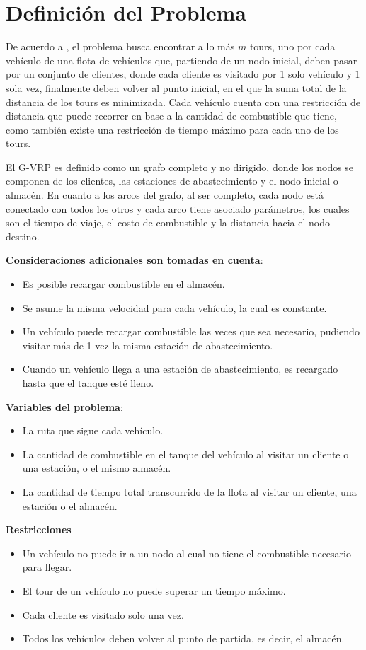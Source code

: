 \documentclass[letter, 10pt]{article}
\begin{document}
\section{Definici\'on del Problema}
De acuerdo a \cite{G-VRP}, el problema busca encontrar a lo más \(m\) tours, uno por cada vehículo de una flota de vehículos que, partiendo de un nodo inicial, deben pasar por un conjunto de clientes, donde cada cliente es visitado por 1 solo vehículo y 1 sola vez, finalmente deben volver al punto inicial, en el que la suma total de la distancia de los tours es minimizada.
Cada vehículo cuenta con una restricción de distancia que puede recorrer en base a la cantidad de combustible que tiene,
como también existe una restricción de tiempo máximo para cada uno de los tours.

El G-VRP es definido como un grafo completo y no dirigido, donde los nodos se componen de los clientes, las estaciones de abastecimiento y el nodo inicial o almacén.
En cuanto a los arcos del grafo, al ser completo, cada nodo está conectado con todos los otros y cada arco tiene asociado parámetros, los cuales son el tiempo de viaje, el costo de combustible y la distancia hacia el nodo destino.
\bigskip

\textbf{Consideraciones adicionales son tomadas en cuenta}:
\begin{itemize}
\item Es posible recargar combustible en el almacén.
\item Se asume la misma velocidad para cada vehículo, la cual es constante.
\item Un vehículo puede recargar combustible las veces que sea necesario, pudiendo visitar más de 1 vez la misma estación de abastecimiento.
\item Cuando un vehículo llega a una estación de abastecimiento, es recargado hasta que el tanque esté lleno.
\end{itemize}

\textbf{Variables del problema}:
\begin{itemize}
\item La ruta que sigue cada vehículo.
\item La cantidad de combustible en el tanque del vehículo al visitar un cliente o
	una estación, o el mismo almacén.
\item La cantidad de tiempo total transcurrido de la flota al visitar un cliente, una estación o
	el almacén.
\end{itemize}

\textbf{Restricciones}
\begin{itemize}
\item Un vehículo no puede ir a un nodo al cual no tiene el combustible necesario para llegar.
\item El tour de un vehículo no puede superar un tiempo máximo.
\item Cada cliente es visitado solo una vez.
\item Todos los vehículos deben volver al punto de partida, es decir, el almacén.
\end{itemize}
\end{document}
